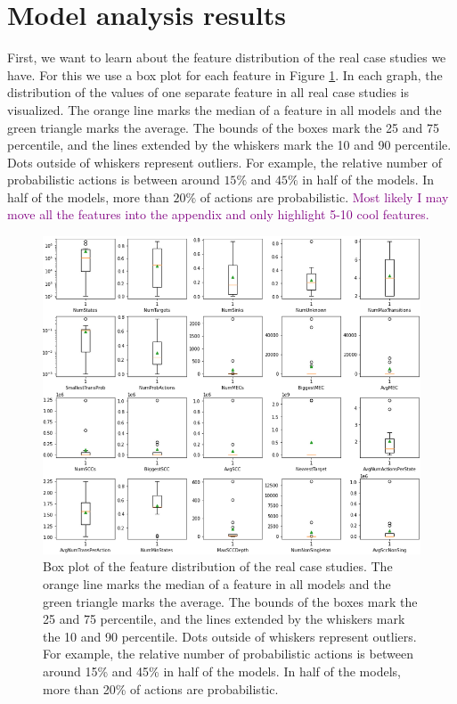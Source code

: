 \section{Model analysis results}

First, we want to learn about the feature distribution of the real case studies we have. 
For this we use a box plot for each feature in Figure \ref{fig:Real_FeatureDistribution}.
In each graph, the distribution of the values of one separate feature in all real case studies is visualized. 
The orange line marks the median of a feature in all models and the green triangle marks the average.
The bounds of the boxes mark the 25 and 75 percentile, and the lines extended by the whiskers mark the 10 and 90 percentile.
Dots outside of whiskers represent outliers.
For example, the relative number of probabilistic actions is between around $15\%$ and $45\%$ in half of the models.
In half of the models, more than $20\%$ of actions are probabilistic.
\textcolor{purple}{Most likely I may move all the features into the appendix and only highlight 5-10 cool features.}
\begin{figure}[h!]
    \centering
    \includegraphics[width=1\textwidth]{figures/Real_FeatureDistribution.png}
    \caption[Feature Distribution of the case studies]{
        Box plot of the feature distribution of the real case studies.
        The orange line marks the median of a feature in all models and the green triangle marks the
        average. The bounds of the boxes mark the 25 and 75 percentile, and the lines extended
        by the whiskers mark the 10 and 90 percentile. Dots outside of whiskers represent
        outliers. For example, the relative number of probabilistic actions is between around
        15\% and 45\% in half of the models. In half of the models, more than 20\% of actions
        are probabilistic.
    }
    \label{fig:Real_FeatureDistribution}
\end{figure}
